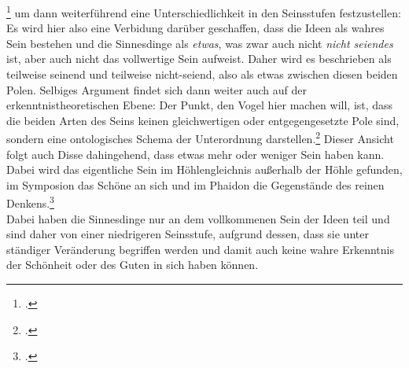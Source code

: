 \footcite[vgl.][S. 162]{Vogel} um dann weiterführend eine Unterschiedlichkeit in den Seinsstufen festzustellen:
Es wird hier also eine Verbidung darüber geschaffen, dass die Ideen als wahres Sein bestehen und die Sinnesdinge als \emph{etwas}, was zwar auch nicht \emph{nicht seiendes} ist, aber auch nicht das vollwertige Sein aufweist. Daher wird es beschrieben als teilweise seinend und teilweise nicht-seiend, also als etwas zwischen diesen beiden Polen. Selbiges Argument findet sich dann weiter auch auf der erkenntnistheoretischen Ebene: 
Der Punkt, den Vogel hier machen will, ist, dass die beiden Arten des Seins keinen gleichwertigen oder entgegengesetzte Pole sind, sondern eine ontologisches Schema der Unterordnung darstellen.\footcite[vgl.][S. 165]{Vogel}
Dieser Ansicht folgt auch Disse dahingehend, dass etwas mehr oder weniger Sein haben kann. Dabei wird das eigentliche Sein im Höhlengleichnis außerhalb der Höhle gefunden, im Symposion das Schöne an sich und im Phaidon die Gegenstände des reinen Denkens.\footcite[vgl.][S. 37]{DisseMetaphysik}\\ Dabei haben die Sinnesdinge nur an dem vollkommenen Sein der Ideen teil und sind daher von einer niedrigeren Seinsstufe, aufgrund dessen, dass sie unter ständiger Veränderung begriffen werden und damit auch keine wahre Erkenntnis der Schönheit oder des Guten in sich haben können.
